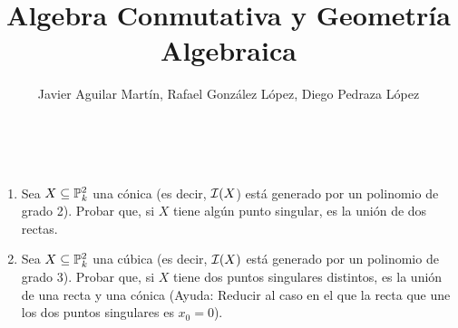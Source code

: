 \documentclass[twoside]{article}
\begin{document}
\title{Algebra Conmutativa y Geometría Algebraica}
\author{Javier Aguilar Martín, Rafael González López, Diego Pedraza López}
\maketitle

\begin{ejercicio}{6}\
 
\begin{enumerate}
\item\label{1} Sea $X \subseteq \mathbb{P}^2_k$ una cónica (es decir, $\mathcal{I}(X$) está generado por
un polinomio de grado 2). Probar que, si $X$ tiene algún punto singular,
es la unión de dos rectas.

\item\label{2} Sea $X \subseteq \mathbb{P}^2_k$ una cúbica (es decir, $\mathcal{I}(X)$ está generado por un polinomio
de grado 3). Probar que, si $X$ tiene dos puntos singulares distintos, es la
unión de una recta y una cónica (Ayuda: Reducir al caso en el que la recta
que une los dos puntos singulares es $x_0 = 0$).

\end{enumerate}
\end{ejercicio}
\end{document}
